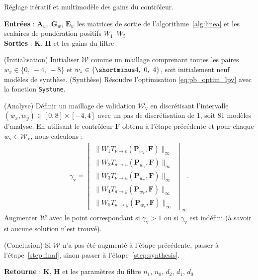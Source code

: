 \begin{algorithm}
  \caption{Réglage itératif et multimodèle des gains du contrôleur.}
  \label{alg:iterativeOptimisation}
  \hspace*{.1cm} \textbf{Entrées} : $\boldsymbol{A}_{w}$, $\boldsymbol{G}_{w}$, $\boldsymbol{E}_{w}$  les matrices de sortie de l'algorithme~\ref{alg:linea} et les scalaires de pondération positifs $W_1$--$W_5$\\
  \hspace*{.1cm} \textbf{Sorties} : $\boldsymbol{K}$, $\boldsymbol{H}$ et les gains du filtre
  \begin{algorithmic}[1]
   
    \State (Initialisation) Initialiser ${\mathcal W}$ comme un maillage comprenant toutes les paires $ w_{x} \in \{0,~-4,~-8\}$ et $ w_{z} \in \{\shortminus 4,~0,~4\}$, soit initialement neuf modèles de synthèse.
    \State \label{step:synthesis} (Synthèse) Résoudre l'optimisation \eqref{eq:pb_optim_lpv} avec la fonction {\tt Systune}.

    \State \label{step:analysis} (Analyse) Définir un maillage de validation ${\mathcal W}_{\text{v}}$ en discrétisant l'intervalle $(w_x,w_y) \in [0,8]\times[-4,4]$ avec un pas de discrétisation de $1$, soit 81 modèles d'analyse. En utilisant le contrôleur $\boldsymbol{F}$ obtenu à l'étape précédente et pour chaque $w_{\text{v}}\in {\mathcal W}_{\text{v}}$, nous calculons :
    \begin{align}
    \label{eq:validation_step}
    \gamma_{\text{v}} = \begin{vmatrix}
    \| W_{1} T_{\nu \rightarrow e}(\boldsymbol{P}_{w_{\text{v}}},\boldsymbol{F})\|_{\infty} \\
    \|W_{2} T_{d \rightarrow u}(\boldsymbol{P}_{w_{\text{v}}},\boldsymbol{F})\|_{\infty}\\
    \|W_{3} T_{\nu \rightarrow u}(\boldsymbol{P}_{w_{\text{v}}},\boldsymbol{F})\|_{\infty}\\
    \|W_{4} T_{d \rightarrow y}(\boldsymbol{P}_{w_{\text{v}}},\boldsymbol{F})\|_{\infty}\\
    \|W_{5} T_{w \rightarrow y}(\boldsymbol{P}_{w_{\text{v}}},\boldsymbol{F})\|_{\infty}
    \end{vmatrix}_{\infty}.
    \end{align}
    Augmenter  ${\mathcal W}$ avec le point correspondant si $\gamma_{\text{v}} > 1$ ou si $\gamma_{\text{v}}$ est indéfini (à savoir si aucune solution n'est trouvé).


    \State (Conclusion) Si ${\mathcal W}$ n'a pas été augmenté à l'étape précédente, passer à l'étape~\ref{step:final}, sinon passer à l'étape~\ref{step:synthesis}.
    
    \State \label{step:final} 
    \textbf{Retourne} : $\boldsymbol{K}$, $\boldsymbol{H}$ et les paramètres du filtre $n_1$, $n_0$,  $d_2$,  $d_1$,  $d_0$

  \end{algorithmic}
\end{algorithm}

